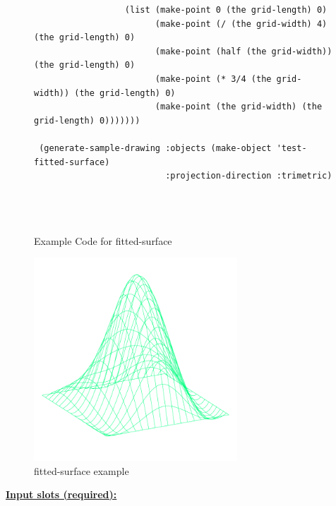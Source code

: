 \documentclass [11pt]{book}
\begin{document}
\begin{itemize}
\begin{figure}
\begin{lrbox}{\boxedverb}
\begin{minipage}{\linewidth}
{\begin{verbatim}
                  (list (make-point 0 (the grid-length) 0)
                        (make-point (/ (the grid-width) 4) (the grid-length) 0)
                        (make-point (half (the grid-width)) (the grid-length) 0)
                        (make-point (* 3/4 (the grid-width)) (the grid-length) 0)
                        (make-point (the grid-width) (the grid-length) 0)))))))

 (generate-sample-drawing :objects (make-object 'test-fitted-surface)
                          :projection-direction :trimetric)


 
\end{verbatim}}
\end{minipage}
\end{lrbox}
\fbox{\usebox{\boxedverb}}

\caption{Example Code for fitted-surface}

\label{fig:example-code-fitted-surface}

\end{figure}

\begin{figure}
\begin{center}
\includegraphics[width=3in,height=3in]{../images/example-fitted-surface.pdf}
\end{center}

\caption{fitted-surface example}

\label{fig:fitted-surface}

\end{figure}





\textbf{
\underline{Input slots (required):}}

\begin{description}


\end{description}
\end{itemize}
\end{document}
